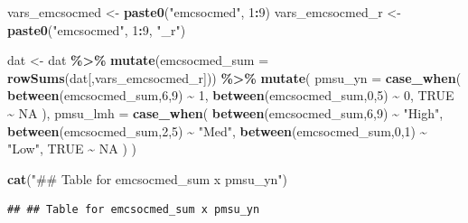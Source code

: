 \documentclass[
]{article}
\newenvironment{Shaded}{\begin{snugshade}}{\end{snugshade}}
\newcommand{\AttributeTok}[1]{\textcolor[rgb]{0.13,0.29,0.53}{#1}}
\newcommand{\ConstantTok}[1]{\textcolor[rgb]{0.56,0.35,0.01}{#1}}
\newcommand{\DecValTok}[1]{\textcolor[rgb]{0.00,0.00,0.81}{#1}}
\newcommand{\FunctionTok}[1]{\textcolor[rgb]{0.13,0.29,0.53}{\textbf{#1}}}
\newcommand{\NormalTok}[1]{#1}
\newcommand{\OtherTok}[1]{\textcolor[rgb]{0.56,0.35,0.01}{#1}}
\newcommand{\SpecialCharTok}[1]{\textcolor[rgb]{0.81,0.36,0.00}{\textbf{#1}}}
\newcommand{\StringTok}[1]{\textcolor[rgb]{0.31,0.60,0.02}{#1}}
\begin{document}
\begin{Shaded}
\begin{Highlighting}[]
\NormalTok{vars\_emcsocmed }\OtherTok{\textless{}{-}} \FunctionTok{paste0}\NormalTok{(}\StringTok{"emcsocmed"}\NormalTok{, }\DecValTok{1}\SpecialCharTok{:}\DecValTok{9}\NormalTok{)}
\NormalTok{vars\_emcsocmed\_r }\OtherTok{\textless{}{-}} \FunctionTok{paste0}\NormalTok{(}\StringTok{"emcsocmed"}\NormalTok{, }\DecValTok{1}\SpecialCharTok{:}\DecValTok{9}\NormalTok{, }\StringTok{"\_r"}\NormalTok{)}

\NormalTok{dat }\OtherTok{\textless{}{-}}\NormalTok{ dat }\SpecialCharTok{\%\textgreater{}\%}
  \FunctionTok{mutate}\NormalTok{(}\AttributeTok{emcsocmed\_sum =} \FunctionTok{rowSums}\NormalTok{(dat[,vars\_emcsocmed\_r])) }\SpecialCharTok{\%\textgreater{}\%}
  \FunctionTok{mutate}\NormalTok{(}
    \AttributeTok{pmsu\_yn =} \FunctionTok{case\_when}\NormalTok{(}
      \FunctionTok{between}\NormalTok{(emcsocmed\_sum,}\DecValTok{6}\NormalTok{,}\DecValTok{9}\NormalTok{) }\SpecialCharTok{\textasciitilde{}} \DecValTok{1}\NormalTok{,}
      \FunctionTok{between}\NormalTok{(emcsocmed\_sum,}\DecValTok{0}\NormalTok{,}\DecValTok{5}\NormalTok{) }\SpecialCharTok{\textasciitilde{}} \DecValTok{0}\NormalTok{,}
      \ConstantTok{TRUE} \SpecialCharTok{\textasciitilde{}} \ConstantTok{NA}
\NormalTok{    ),}
    \AttributeTok{pmsu\_lmh =} \FunctionTok{case\_when}\NormalTok{(}
      \FunctionTok{between}\NormalTok{(emcsocmed\_sum,}\DecValTok{6}\NormalTok{,}\DecValTok{9}\NormalTok{) }\SpecialCharTok{\textasciitilde{}} \StringTok{"High"}\NormalTok{,}
      \FunctionTok{between}\NormalTok{(emcsocmed\_sum,}\DecValTok{2}\NormalTok{,}\DecValTok{5}\NormalTok{) }\SpecialCharTok{\textasciitilde{}} \StringTok{"Med"}\NormalTok{,}
      \FunctionTok{between}\NormalTok{(emcsocmed\_sum,}\DecValTok{0}\NormalTok{,}\DecValTok{1}\NormalTok{) }\SpecialCharTok{\textasciitilde{}} \StringTok{"Low"}\NormalTok{,}
      \ConstantTok{TRUE} \SpecialCharTok{\textasciitilde{}} \ConstantTok{NA}
\NormalTok{    )}
\NormalTok{  )}

\FunctionTok{cat}\NormalTok{(}\StringTok{"\#\# Table for emcsocmed\_sum x pmsu\_yn"}\NormalTok{)}
\end{Highlighting}
\end{Shaded}

\begin{verbatim}
## ## Table for emcsocmed_sum x pmsu_yn
\end{verbatim}

\begin{Shaded}
\end{Shaded}
\end{document}

